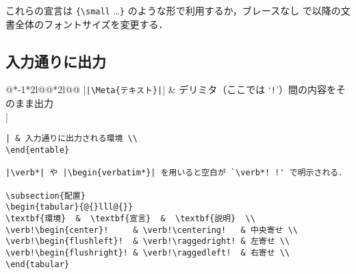 \documentclass[10pt,a4paper,landscape]{jarticle}
\makeatletter
\def\set@etsep#1#2{\def\etcolsep{#1}\def\etitemsep{#2}}
\newenvironment{entable}[3][\quad\qquad]{\set@etsep#1\relax\relax
  \begin{tabular}{%
    @{}*{\the\numexpr#3-1}{*{#2}{l@{\etcolsep}}@{\etitemsep}}*{#2}{l@{\etcolsep}}@{}}}{%
  \end{tabular}}
\newcommand{\Meta}[1]{$\langle$\mbox{}\emph{#1}\mbox{}$\rangle$}
\makeatother
\begin{document}
\egroup

これらの宣言は \verb!{\small! \ldots\verb!}! のような形で利用するか，ブレースなし
で以降の文書全体のフォントサイズを変更する．

\subsection{入力通りに出力}

\begin{entable}[\enspace]{2}{1}
|\verb!|\Meta{テキスト}|!| & デリミタ（ここでは `\texttt{!}'）間の内容をそのまま出力 \\
|\begin{verbatim}| & 入力通りに出力される環境 \\
\end{entable}

|\verb*| や |\begin{verbatim*}| を用いると空白が `\verb*! !' で明示される．

\subsection{配置}
\begin{tabular}{@{}lll@{}}
\textbf{環境}  &  \textbf{宣言}  &  \textbf{説明}  \\
\verb!\begin{center}!     & \verb!\centering!   & 中央寄せ \\
\verb!\begin{flushleft}!  & \verb!\raggedright! & 左寄せ \\
\verb!\begin{flushright}! & \verb!\raggedleft!  & 右寄せ \\
\end{tabular}


\end{verbatim}
\end{entable}
\end{document}
\end{multicols}
\end{document}
